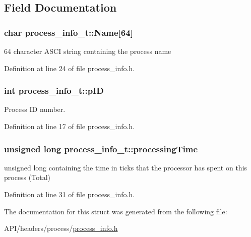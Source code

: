 \subsection{Field Documentation}
\hypertarget{structprocess__info__t_a4dfd7018290aeac9e4ed3b7309484a45}{
\subsubsection[{Name}]{\setlength{\rightskip}{0pt plus 5cm}char {\bf process\_\-info\_\-t::Name}\mbox{[}64\mbox{]}}}
\label{structprocess__info__t_a4dfd7018290aeac9e4ed3b7309484a45}


64 character ASCI string containing the process name 



Definition at line 24 of file process\_\-info.h.

\hypertarget{structprocess__info__t_a3662d03c6f9db2c9b02d9c2eb7b5eb88}{
\subsubsection[{pID}]{\setlength{\rightskip}{0pt plus 5cm}int {\bf process\_\-info\_\-t::pID}}}
\label{structprocess__info__t_a3662d03c6f9db2c9b02d9c2eb7b5eb88}


Process ID number. 



Definition at line 17 of file process\_\-info.h.

\hypertarget{structprocess__info__t_acf06bec557ae461f71c391f0e604ecd8}{
\subsubsection[{processingTime}]{\setlength{\rightskip}{0pt plus 5cm}unsigned long {\bf process\_\-info\_\-t::processingTime}}}
\label{structprocess__info__t_acf06bec557ae461f71c391f0e604ecd8}


unsigned long containing the time in ticks that the processor has spent on this process (Total) 



Definition at line 31 of file process\_\-info.h.



The documentation for this struct was generated from the following file:\begin{DoxyCompactItemize}
\item 
API/headers/process/\hyperlink{process__info_8h}{process\_\-info.h}\end{DoxyCompactItemize}
